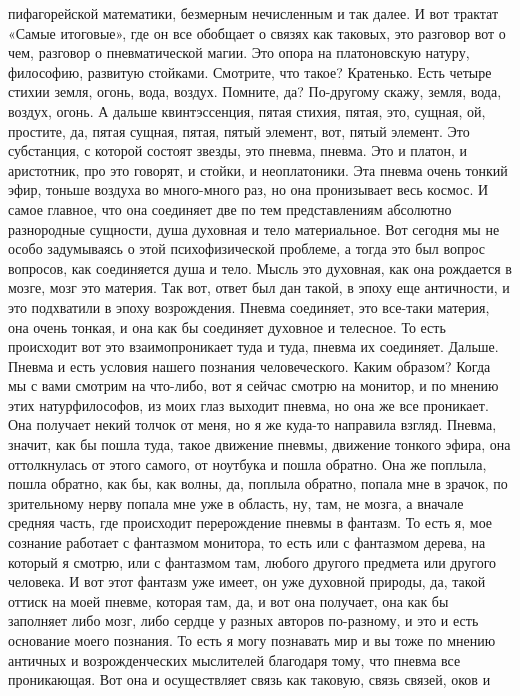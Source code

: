 пифагорейской математики, безмерным нечисленным и так далее. И вот трактат
«Самые итоговые», где он все обобщает о связях как таковых, это разговор вот о
чем, разговор о пневматической магии. Это опора на платоновскую натуру,
философию, развитую стойками. Смотрите, что такое? Кратенько. Есть четыре стихии
земля, огонь, вода, воздух. Помните, да? По-другому скажу, земля, вода, воздух,
огонь. А дальше квинтэссенция, пятая стихия, пятая, это, сущная, ой, простите,
да, пятая сущная, пятая, пятый элемент, вот, пятый элемент. Это субстанция, с
которой состоят звезды, это пневма, пневма. Это и платон, и аристотник, про это
говорят, и стойки, и неоплатоники. Эта пневма очень тонкий эфир, тоньше воздуха
во много-много раз, но она пронизывает весь космос. И самое главное, что она
соединяет две по тем представлениям абсолютно разнородные сущности, душа
духовная и тело материальное. Вот сегодня мы не особо задумываясь о этой
психофизической проблеме, а тогда это был вопрос вопросов, как соединяется душа
и тело. Мысль это духовная, как она рождается в мозге, мозг это материя. Так
вот, ответ был дан такой, в эпоху еще античности, и это подхватили в эпоху
возрождения. Пневма соединяет, это все-таки материя, она очень тонкая, и она как
бы соединяет духовное и телесное. То есть происходит вот это взаимопроникает
туда и туда, пневма их соединяет. Дальше. Пневма и есть условия нашего познания
человеческого. Каким образом? Когда мы с вами смотрим на что-либо, вот я сейчас
смотрю на монитор, и по мнению этих натурфилософов, из моих глаз выходит пневма,
но она же все проникает. Она получает некий толчок от меня, но я же куда-то
направила взгляд. Пневма, значит, как бы пошла туда, такое движение пневмы,
движение тонкого эфира, она оттолкнулась от этого самого, от ноутбука и пошла
обратно. Она же поплыла, пошла обратно, как бы, как волны, да, поплыла обратно,
попала мне в зрачок, по зрительному нерву попала мне уже в область, ну, там, не
мозга, а вначале средняя часть, где происходит перерождение пневмы в фантазм. То
есть я, мое сознание работает с фантазмом монитора, то есть или с фантазмом
дерева, на который я смотрю, или с фантазмом там, любого другого предмета или
другого человека. И вот этот фантазм уже имеет, он уже духовной природы, да,
такой оттиск на моей пневме, которая там, да, и вот она получает, она как бы
заполняет либо мозг, либо сердце у разных авторов по-разному, и это и есть
основание моего познания. То есть я могу познавать мир и вы тоже по мнению
античных и возрожденческих мыслителей благодаря тому, что пневма все
проникающая. Вот она и осуществляет связь как таковую, связь связей, оков и
